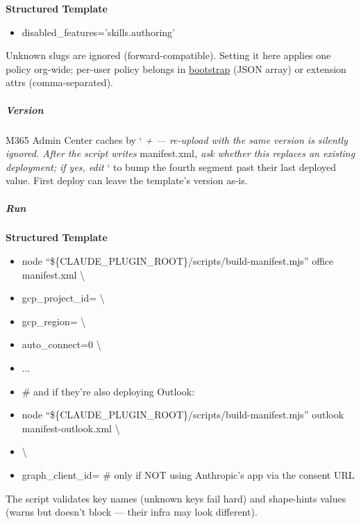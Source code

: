 \documentclass[11pt]{article}
\begin{document}
\textbf{Structured Template}
\begin{itemize}[leftmargin=*,itemsep=2pt,topsep=2pt]
\item {} disabled\_\allowbreak{}features='skills.authoring'
\end{itemize}

Unknown slugs are ignored (forward-compatible). Setting it here applies one policy org-wide; per-user policy belongs in \href{bootstrap.md\#disabled\_\allowbreak{}features}{bootstrap} (JSON array) or extension attrs (comma-separated).


\subparagraph{Version}\mbox{}\par

M365 Admin Center caches by `\emph{ + }\emph{ — re-upload with the same version is silently ignored. After the script writes }manifest.xml\emph{, ask whether this replaces an existing deployment; if yes, edit }` to bump the fourth segment past their last deployed value. First deploy can leave the template's version as-is.


\subparagraph{Run}\mbox{}\par

\textbf{Structured Template}
\begin{itemize}[leftmargin=*,itemsep=2pt,topsep=2pt]
\item {} node ``\$\{CLAUDE\_\allowbreak{}PLUGIN\_\allowbreak{}ROOT\}/scripts/build-manifest.mjs'' office manifest.xml \textbackslash{}
\item {} gcp\_\allowbreak{}project\_\allowbreak{}id= \textbackslash{}
\item {} gcp\_\allowbreak{}region= \textbackslash{}
\item {} auto\_\allowbreak{}connect=0 \textbackslash{}
\item {} ...
\item {} \# and if they're also deploying Outlook:
\item {} node ``\$\{CLAUDE\_\allowbreak{}PLUGIN\_\allowbreak{}ROOT\}/scripts/build-manifest.mjs'' outlook manifest-outlook.xml \textbackslash{}
\item {} \textbackslash{}
\item {} graph\_\allowbreak{}client\_\allowbreak{}id= \# only if NOT using Anthropic's app via the consent URL
\end{itemize}

The script validates key names (unknown keys fail hard) and shape-hints values (warns but doesn't block — their infra may look different).
\end{document}
